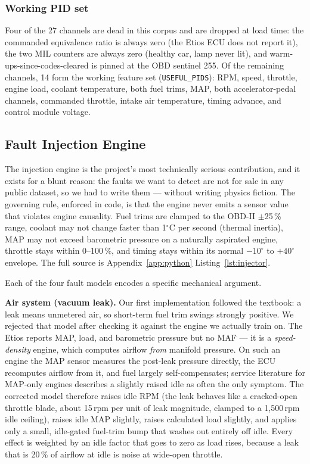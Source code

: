 \subsubsection{Working PID set}

Four of the 27 channels are dead in this corpus and are dropped at load
time: the commanded equivalence ratio is always zero (the Etios ECU does not
report it), the two MIL counters are always zero (healthy car, lamp never
lit), and warm-ups-since-codes-cleared is pinned at the OBD sentinel 255.
Of the remaining channels, 14 form the working feature set
(\texttt{USEFUL\_PIDS}): RPM, speed, throttle, engine load, coolant
temperature, both fuel trims, MAP, both accelerator-pedal channels,
commanded throttle, intake air temperature, timing advance, and control
module voltage.

\subsection{Fault Injection Engine}
\label{sec:injector}

The injection engine is the project's most technically serious contribution,
and it exists for a blunt reason: the faults we want to detect are not for
sale in any public dataset, so we had to write them --- without writing
physics fiction. The governing rule, enforced in code, is that the engine
never emits a sensor value that violates engine causality. Fuel trims are
clamped to the OBD-II $\pm$25\,\% range, coolant may not change faster than
1$^{\circ}$C per second (thermal inertia), MAP may not exceed barometric
pressure on a naturally aspirated engine, throttle stays within
0--100\,\%, and timing stays within its normal $-10^{\circ}$ to
$+40^{\circ}$ envelope. The full source is Appendix~\ref{app:python}
Listing~\ref{lst:injector}.

Each of the four fault models encodes a specific mechanical argument.

\textbf{Air system (vacuum leak).} Our first implementation followed the
textbook: a leak means unmetered air, so short-term fuel trim swings
strongly positive. We rejected that model after checking it against the
engine we actually train on. The Etios reports MAP, load, and barometric
pressure but no MAF --- it is a \emph{speed-density} engine, which computes
airflow \emph{from} manifold pressure. On such an engine the MAP sensor
measures the post-leak pressure directly, the ECU recomputes airflow from
it, and fuel largely self-compensates; service literature for MAP-only
engines describes a slightly raised idle as often the only symptom. The
corrected model therefore raises idle RPM (the leak behaves like a
cracked-open throttle blade, about 15\,rpm per unit of leak magnitude,
clamped to a 1{,}500\,rpm idle ceiling), raises idle MAP slightly, raises
calculated load slightly, and applies only a small, idle-gated fuel-trim
bump that washes out entirely off idle. Every effect is weighted by an
idle factor that goes to zero as load rises, because a leak that is 20\,\%
of airflow at idle is noise at wide-open throttle.

